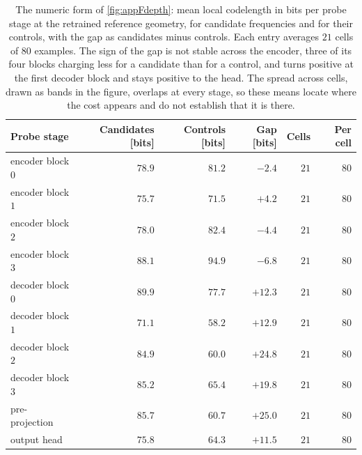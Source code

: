 \begin{table}[tbp]
    \centering
\small
    \setlength{\tabcolsep}{6pt}
    \begin{tabular}{@{}lrrrrr@{}}
        \toprule
        \textbf{Probe stage} & \textbf{Candidates [bits]} & \textbf{Controls [bits]} & \textbf{Gap [bits]} & \textbf{Cells} & \textbf{Per cell} \\
        \midrule
        encoder block $0$  & $78.9$ & $81.2$ & $-2.4$  & $21$ & $80$ \\
        encoder block $1$  & $75.7$ & $71.5$ & $+4.2$  & $21$ & $80$ \\
        encoder block $2$  & $78.0$ & $82.4$ & $-4.4$  & $21$ & $80$ \\
        encoder block $3$  & $88.1$ & $94.9$ & $-6.8$  & $21$ & $80$ \\
        \addlinespace[2pt]
        decoder block $0$  & $89.9$ & $77.7$ & $+12.3$ & $21$ & $80$ \\
        decoder block $1$  & $71.1$ & $58.2$ & $+12.9$ & $21$ & $80$ \\
        decoder block $2$  & $84.9$ & $60.0$ & $+24.8$ & $21$ & $80$ \\
        decoder block $3$  & $85.2$ & $65.4$ & $+19.8$ & $21$ & $80$ \\
        \addlinespace[2pt]
        pre-projection     & $85.7$ & $60.7$ & $+25.0$ & $21$ & $80$ \\
        output head        & $75.8$ & $64.3$ & $+11.5$ & $21$ & $80$ \\
        \bottomrule
    \end{tabular}
\caption{The numeric form of \autoref{fig:appFdepth}: mean local codelength in bits per probe stage at the retrained reference geometry, for candidate frequencies and for their controls, with the gap as candidates minus controls. Each entry averages $21$ cells of $80$ examples. The sign of the gap is not stable across the encoder, three of its four blocks charging less for a candidate than for a control, and turns positive at the first decoder block and stays positive to the head. The spread across cells, drawn as bands in the figure, overlaps at every stage, so these means locate where the cost appears and do not establish that it is there.}
    \label{tab:appFprofile}
\end{table}
